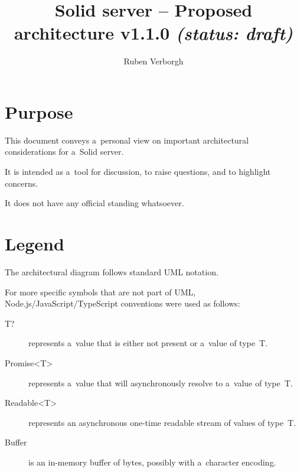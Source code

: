 \documentclass[10pt]{article}
\title{
  Solid server -- Proposed architecture v1.1.0
  \it (status: draft)
}
\author{Ruben Verborgh}
\begin{document}
\maketitle


\section*{Purpose}
This document conveys a~personal view
on important architectural considerations for a~Solid server.

It is intended as a~tool for discussion,
to raise questions,
and to highlight concerns.

It does not have any official standing whatsoever.


\section*{Legend}
The architectural diagram follows standard UML notation.

For more specific symbols that are not part of UML,
Node.js/JavaScript/TypeScript conventions were used as follows:

\begin{description}
  \item[T?] represents a~value that is either not present
            or a~value of type~T.
  \item[Promise<T>] represents a~value that will asynchronously resolve
                    to a~value of type~T.
  \item[Readable<T>] represents an asynchronous one-time readable stream
                     of values of type~T.
  \item[Buffer] is an in-memory buffer of bytes,
                possibly with a~character encoding.
\end{description}


\newcommand\ResourceStoreBody{%
  + getRepresentation(ResourceIdentifier, RepresentationPreferences) : Promise<Representation>\\
  + addResource(container : ResourceIdentifier, Representation) : Promise<ResourceIdentifier>\\
  + setRepresentation(ResourceIdentifier, Representation) : Promise<void>\\
  + deleteResource(ResourceIdentifier) : Promise<void>\\
  + modifyResource(ResourceIdentifier, Patch) : Promise<void>\\
}
\end{document}
